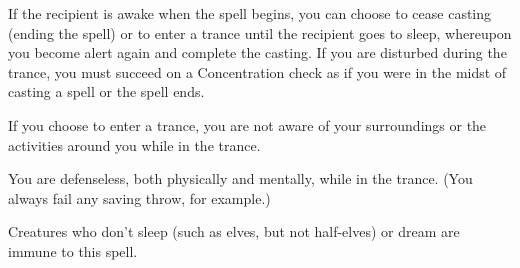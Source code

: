 If the recipient is awake when the spell begins, you can choose to cease casting 
(ending the spell) or to enter a trance until the recipient goes to sleep, whereupon 
you become alert again and complete the casting. If you are disturbed during the 
trance, you must succeed on a Concentration check as if you were in the midst of 
casting a spell or the spell ends.

If you choose to enter a trance, you are not aware of your surroundings or the 
activities around you while in the trance.

You are defenseless, both physically and mentally, while in the trance. (You always 
fail any saving throw, for example.)

Creatures who don't sleep (such as elves, but not half-elves) or dream are immune 
to this spell.

